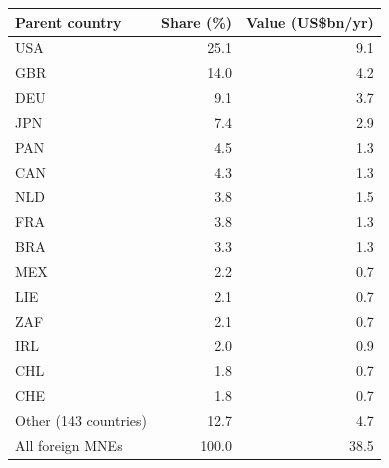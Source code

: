 \begin{tabular}{lrr}
\toprule
Parent country & Share (\%) & Value (US\$bn/yr) \\
\midrule
USA & 25.1 & 9.1 \\
GBR & 14.0 & 4.2 \\
DEU & 9.1 & 3.7 \\
JPN & 7.4 & 2.9 \\
PAN & 4.5 & 1.3 \\
CAN & 4.3 & 1.3 \\
NLD & 3.8 & 1.5 \\
FRA & 3.8 & 1.3 \\
BRA & 3.3 & 1.3 \\
MEX & 2.2 & 0.7 \\
LIE & 2.1 & 0.7 \\
ZAF & 2.1 & 0.7 \\
IRL & 2.0 & 0.9 \\
CHL & 1.8 & 0.7 \\
CHE & 1.8 & 0.7 \\
Other (143 countries) & 12.7 & 4.7 \\
\midrule
All foreign MNEs & 100.0 & 38.5 \\
\bottomrule
\end{tabular}

